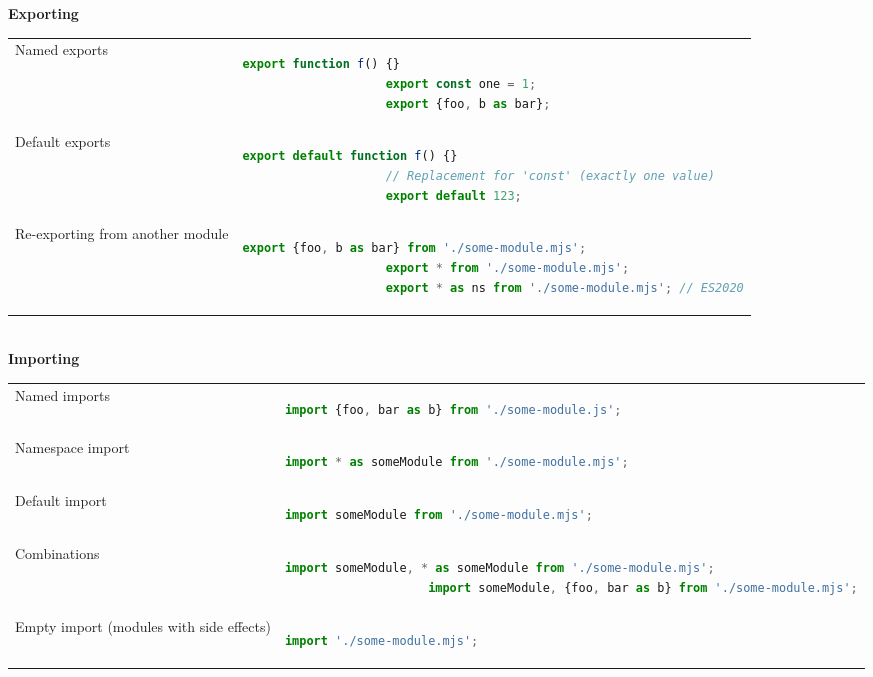 \documentclass[a4paper, landscape, 8pt]{scrartcl}
\begin{document}
\begin{multicols*}{4}
        \textbf{Exporting} \\
        \begin{tabular}{p{2cm} p{4cm}}
            Named exports & \begin{lstlisting}[language=JavaScript]
                    export function f() {}
                    export const one = 1;
                    export {foo, b as bar};
            \end{lstlisting} \\
            Default exports & \begin{lstlisting}[language=JavaScript]
                    export default function f() {}
                    // Replacement for 'const' (exactly one value)
                    export default 123;
            \end{lstlisting} \\
            Re-exporting from another module & 
            \begin{lstlisting}[language=JavaScript]
                    export {foo, b as bar} from './some-module.mjs';
                    export * from './some-module.mjs';
                    export * as ns from './some-module.mjs'; // ES2020
            \end{lstlisting}
        \end{tabular}
        \\
        \textbf{Importing} \\
        \begin{tabular}{p{2cm} p{4cm}}
            Named imports &
            \begin{lstlisting}[language=JavaScript]
                    import {foo, bar as b} from './some-module.js';
            \end{lstlisting} \\
            Namespace import &
            \begin{lstlisting}[language=JavaScript]
                    import * as someModule from './some-module.mjs';
            \end{lstlisting} \\
            Default import &
            \begin{lstlisting}[language=JavaScript]
                    import someModule from './some-module.mjs';
            \end{lstlisting} \\
            Combinations &
            \begin{lstlisting}[language=JavaScript]
                    import someModule, * as someModule from './some-module.mjs';
                    import someModule, {foo, bar as b} from './some-module.mjs';
            \end{lstlisting} \\
            Empty import (modules with side effects) &
            \begin{lstlisting}[language=JavaScript]
                    import './some-module.mjs';
            \end{lstlisting} \\
        \end{tabular}


\end{multicols*}
\end{document}
